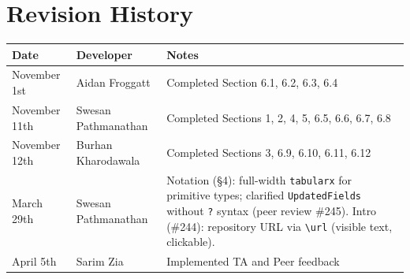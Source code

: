 \section{Revision History}

\begin{tabularx}{\textwidth}{llX}
\toprule
{\bf Date} & {\bf Developer} & {\bf Notes} \\
\midrule
November 1st & Aidan Froggatt & Completed Section 6.1, 6.2, 6.3, 6.4\\
November 11th & Swesan Pathmanathan & Completed Sections 1, 2, 4, 5, 6.5, 6.6, 6.7, 6.8 \\
November 12th & Burhan Kharodawala & Completed Sections 3, 6.9, 6.10, 6.11, 6.12\\
March 29th & Swesan Pathmanathan & Notation (\S4): full-width \texttt{tabularx} for primitive types; clarified \texttt{UpdatedFields} without \texttt{?} syntax (peer review \#245). Intro (\#244): repository URL via \texttt{\textbackslash url} (visible text, clickable).\\
April 5th & Sarim Zia & Implemented TA and Peer feedback \\
\bottomrule
\end{tabularx}

~\newpage
